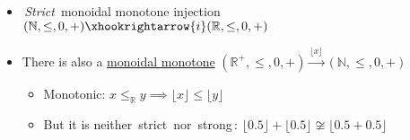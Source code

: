 \begin{itemize}
    \item \,\emph{Strict}\, monoidal monotone injection $(\mathbb{N},\leq, 0, +) \xhookrightarrow{i} (\mathbb{R},\leq,0,+)$
    \item There is also a \href{doc/1 math/Seven Sketches in Compositionality/Chapter 2: Resource theories/2 Symmetric monoidal preorders/5 Monoidal monotone maps/1 Monoidal monotone}{monoidal monotone} $(\mathbb{R}^+,\leq, 0, +) \xrightarrow{\lfloor x \rfloor} (\mathbb{N},\leq,0,+)$
          \begin{itemize}
            \item Monotonic: $x \leq_\mathbb{R} y \implies \lfloor x \rfloor \leq \lfloor y \rfloor$
            \item But it is neither \,strict\, nor \,strong\,: $\lfloor 0.5 \rfloor + \lfloor 0.5 \rfloor \not \cong \lfloor 0.5+0.5 \rfloor$
          \end{itemize}
  \end{itemize}